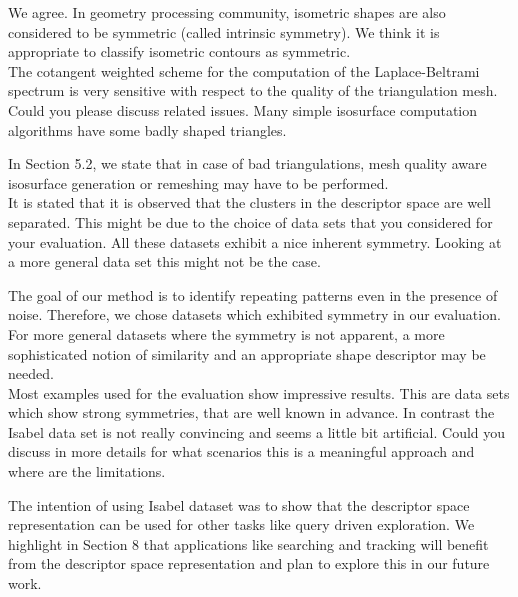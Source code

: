 \documentclass[10pt]{article}
\begin{document}
   {\color{blue} We agree. In geometry processing community,
	   isometric shapes are also considered to be symmetric (called intrinsic symmetry).
   We think it is appropriate to classify isometric contours as symmetric.}\\

   The cotangent weighted scheme for the computation of the
   Laplace-Beltrami spectrum is very sensitive with respect to the quality
   of the triangulation mesh. Could you please discuss related issues. Many
   simple isosurface computation algorithms have some badly shaped
   triangles.

   {\color{blue}In Section 5.2, we state that in case of bad triangulations,
	   mesh quality aware isosurface generation or remeshing may have to
   be performed.}\\


   It is stated that it is observed that the clusters in the descriptor
   space are well separated. This might be due to the choice of data sets
   that you considered for your evaluation. All these datasets exhibit a
   nice inherent symmetry. Looking at a more general data set this might not
   be the case.

   {\color{blue} The goal of our method is to identify repeating patterns even in
	   the presence of noise. Therefore, we chose datasets which exhibited symmetry in our
	   evaluation. For more general datasets where the symmetry is not apparent, a more sophisticated
	   notion of similarity and an appropriate  shape descriptor may be needed.}\\

	
   Most examples used for the evaluation show impressive results. This are
   data sets which show strong symmetries, that are well known in advance.
   In contrast the Isabel data set is not really convincing and seems a
   little bit artificial. Could you discuss in more details for what
   scenarios this is a meaningful approach and where are the limitations.

   {\color{blue}The intention of using Isabel dataset was to show that the descriptor space representation
	   can be used for other tasks like query driven exploration. We highlight in Section 8
	   that applications like searching and tracking will benefit from the descriptor
   space representation and plan to explore this in our future work.}\\
\end{document}
